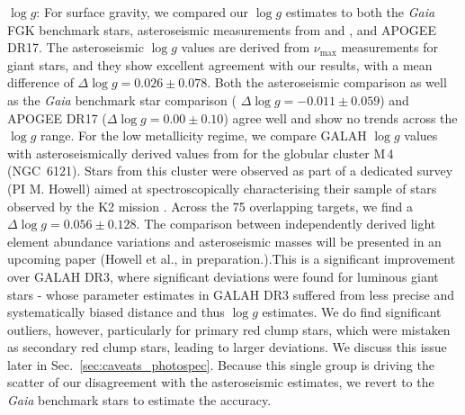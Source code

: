 \documentclass[
  journal=pasa,
  manuscript=research-paper, %
  year=2024,
  volume=37
]{cup-journal}
\newcommand{\logg}{$\log g$\xspace}
\newcommand{\Gaia}{\textit{Gaia}\xspace}
\begin{document}
\logg: For surface gravity, we compared our \logg estimates to both the \Gaia FGK benchmark stars, asteroseismic measurements from \citet{Zinn2020} and \citet{Hon2021}, and APOGEE DR17. The asteroseismic \logg values are derived from $\nu_\mathrm{max}$ measurements for giant stars, and they show excellent agreement with our results, with a mean difference of $\Delta \log g = 0.026 \pm 0.078$. Both the asteroseismic comparison as well as the \Gaia benchmark star comparison ( $\Delta \log g = -0.011 \pm 0.059$) and APOGEE DR17 ($\Delta \log g = 0.00 \pm 0.10$) agree well and show no trends across the \logg range. For the low metallicity regime, we compare GALAH \logg values with asteroseismically derived values from \cite{Howell2022} for the globular cluster M\,4 (NGC~6121). Stars from this cluster were observed as part of a dedicated survey (PI M. Howell) aimed at spectroscopically characterising their sample of stars observed by the K2 mission \citep{Howell2014}. Across the 75 overlapping targets, we find a $\Delta \log g = 0.056 \pm 0.128$. The comparison between independently derived light element abundance variations and asteroseismic masses will be presented in an upcoming paper (Howell et al., in preparation.).This is a significant improvement over GALAH DR3, where significant deviations were found for luminous giant stars - whose parameter estimates in GALAH DR3 suffered from less precise and systematically biased distance and thus \logg estimates. We do find significant outliers, however, particularly for primary red clump stars, which were mistaken as secondary red clump stars, leading to larger deviations. We discuss this issue later in Sec.~\ref{sec:caveats_photospec}. Because this single group is driving the scatter of our disagreement with the asteroseismic estimates, we revert to the \Gaia benchmark stars to estimate the accuracy.
\end{document}
